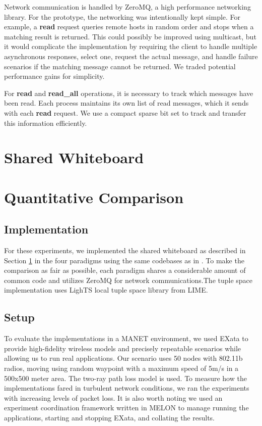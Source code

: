 \documentclass{llncs}
\begin{document}
Network communication is handled by ZeroMQ\cite{hintjens2013zeromq}, a high performance networking library. For the prototype, the networking was intentionally kept simple. For example, a \textbf{read} request queries remote hosts in random order and stops when a matching result is returned. This could possibly be improved using multicast, but it would complicate the implementation by requiring the client to handle multiple asynchronous responses, select one, request the actual message, and handle failure scenarios if the matching message cannot be returned. We traded potential performance gains for simplicity. 

For \textbf{read} and \textbf{read\_all} operations, it is necessary to track which messages have been read. Each process maintains its own list of read messages, which it sends with each \textbf{read} request. We use a compact sparse bit set to track and transfer this information efficiently.

\section{Shared Whiteboard}\label{sec:wb}

\section{Quantitative Comparison}

\subsection{Implementation}

For these experiments, we implemented the shared whiteboard as described in Section \ref{sec:wb} in the four paradigms using the same codebases as in \cite{melon}. To make the comparison as fair as possible, each paradigm shares a considerable amount of common code and utilizes ZeroMQ for network communications.The tuple space implementation uses LighTS\cite{lights} local tuple space library from LIME.

\subsection{Setup}

To evaluate the implementations in a MANET environment, we used EXata\cite{exata} to provide high-fidelity wireless models and precisely repeatable scenarios while allowing us to run real applications. Our scenario uses 50 nodes with 802.11b radios, moving using random waypoint with a maximum speed of 5m/s in a 500x500 meter area. The two-ray path loss model is used. To measure how the implementations fared in turbulent network conditions, we ran the experiments with increasing levels of packet loss. It is also worth noting we used an experiment coordination framework written in MELON to manage running the applications, starting and stopping EXata, and collating the results.
\end{document}
